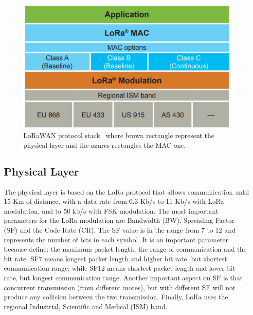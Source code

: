 \begin{figure}[h]
    \centering
    \includegraphics{figures/loraStack.png}
    \caption{LoRaWAN protocol stack~\cite{loraalliance2020} where brown rectangle represent the physical layer and the azures rectangles the MAC one.}
    \label{fig:LoRaStack}
\end{figure}

\subsection{Physical Layer}
The physical layer is based on the LoRa protocol that allows communication until 15 Km of distance, with a data rate from 0.3 Kb/s to 11 Kb/s with LoRa modulation, and to 50 kb/s with FSK modulation.
% 
The most important parameters for the LoRa modulation are Bandwidth (BW), Spreading Factor (SF) and the Code Rate (CR).
% 
The SF value is in the range from 7 to 12 and represents the number of bits in each symbol.
% 
It is an important parameter because define: the maximum packet length, the range of communication and the bit rate.
% 
SF7 means longest packet length and higher bit rate, but shortest communication range; while SF12 means shortest packet length and lower bit rate, but longest communication range.
% 
Another important aspect on SF is that concurrent transmission (from different motes), but with different SF will not produce any collision between the two transmission.
% 
Finally, LoRa uses the regional Industrial, Scientific and Medical (ISM) band.

